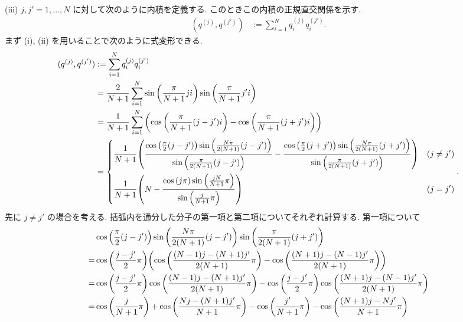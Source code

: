 \documentclass[a4paper,dvipdfmx]{jsarticle}
\theoremstyle{definition}
\begin{document}
(iii) $j, j' = 1,\ldots,N$ に対して次のように内積を定義する. このときこの内積の正規直交関係を示す.
\begin{align}
  (q^{(j)}, q^{(j')}) & := \sum_{i = 1}^{N}q_i^{(j)}q_i^{(j')}.
\end{align}
まず (i), (ii) を用いることで次のように式変形できる.
\begin{align}
  (q^{(j)}, q^{(j')}) & := \sum_{i = 1}^{N}q_i^{(j)}q_i^{(j')}                                                                                                                                                                                                                                              \\
                      & = \frac{2}{N+1}\sum_{i = 1}^{N}\sin\qty(\frac{\pi}{N+1}ji)\sin\qty(\frac{\pi}{N+1}j'i)                                                                                                                                                                                              \\
                      & = \frac{1}{N+1}\sum_{i = 1}^{N}\qty(\cos\qty(\frac{\pi}{N+1}(j - j')i) - \cos\qty(\frac{\pi}{N+1}(j + j')i))                                                                                                                                                                        \\
                      & = \begin{dcases}
                            \frac{1}{N+1}\qty(\frac{\cos\qty(\frac{\pi}{2}(j - j'))\sin\qty(\frac{N\pi}{2(N+1)}(j - j'))}{\sin\qty(\frac{\pi}{2(N+1)}(j - j'))} - \frac{\cos\qty(\frac{\pi}{2}(j + j'))\sin\qty(\frac{N\pi}{2(N+1)}(j + j'))}{\sin\qty(\frac{\pi}{2(N+1)}(j + j'))}) & (j \neq j') \\
                            \frac{1}{N+1}\qty(N - \frac{\cos\qty(j\pi)\sin\qty(\frac{jN}{N+1}\pi)}{\sin\qty(\frac{j}{N+1}\pi)})                                                                                                                                                      & (j = j')
                          \end{dcases}.
\end{align}
先に $j \neq j'$ の場合を考える. 括弧内を通分した分子の第一項と第二項についてそれぞれ計算する. 第一項について
\begin{align}
    & \cos\qty(\frac{\pi}{2}(j - j'))\sin\qty(\frac{N\pi}{2(N+1)}(j - j'))\sin\qty(\frac{\pi}{2(N+1)}(j + j'))                                                      \\
  = & \cos\qty(\frac{j - j'}{2}\pi)\qty(\cos\qty(\frac{(N-1)j - (N+1)j'}{2(N+1)}\pi) - \cos\qty(\frac{(N+1)j - (N-1)j'}{2(N+1)}\pi))                                \\
  = & \cos\qty(\frac{j - j'}{2}\pi)\cos\qty(\frac{(N-1)j - (N+1)j'}{2(N+1)}\pi) - \cos\qty(\frac{j - j'}{2}\pi)\cos\qty(\frac{(N+1)j - (N-1)j'}{2(N+1)}\pi)         \\
  = & \cos\qty(\frac{j}{N+1}\pi) + \cos\qty(\frac{Nj - (N+1)j'}{N+1}\pi) - \cos\qty(\frac{j'}{N+1}\pi) - \cos\qty(\frac{(N+1)j - Nj'}{N+1}\pi) \label{Q17-3. iii 1}
\end{align}
\end{document}
